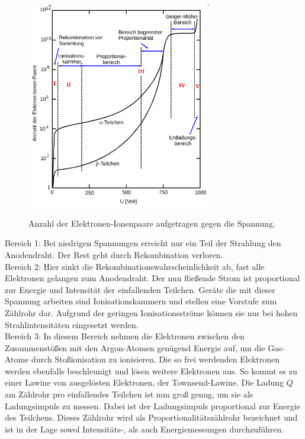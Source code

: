 \begin{figure}[H]
  \centering
  \includegraphics[height=9cm]{diagramm.png}
  \caption{Anzahl der Elektronen-Ionenpaare aufgetragen gegen die Spannung.}
  \label{fig:diagramm}
  \cite{skript}
\end{figure}

Bereich 1: Bei niedrigen Spannungen erreicht nur ein Teil der Strahlung den Anodendraht.
Der Rest geht durch Rekombination verloren.\\

Bereich 2: Hier sinkt die Rekombinationswahrscheinlichkeit ab, fast alle
Elektronen gelangen zum Anodendraht. Der nun fließende Strom ist proportional
zur Energie und Intensität der einfallenden Teilchen. Geräte die mit dieser
Spannung arbeiten sind Ionisationskammern und stellen eine Vorstufe zum
Zählrohr dar. Aufgrund der geringen Ionisationsströme können sie nur bei hohen
Strahlintensitäten eingesetzt werden.\\

Bereich 3: In diesem Bereich nehmen die Elektronen zwischen den Zusammenstößen mit
den Argon-Atomen genügend Energie auf, um die Gas-Atome durch Stoßionisation zu
ionisieren. Die so frei werdenden Elektronen werden ebenfalls beschleunigt und
lösen weitere Elektronen aus. So kommt es zu einer Lawine von ausgelösten
Elektronen, der Townsend-Lawine. Die Ladung $Q$ am Zählrohr pro einfallendes Teilchen ist
nun groß genug, um sie als Ladungsimpuls zu messen.
Dabei ist der Ladungsimpuls proportional zur Energie des Teilchens.
Dieses Zählrohr wird als Proportionalitätszählrohr bezeichnet und ist in der Lage
sowol Intensitäts-, als auch Energiemessungen durchzuführen.\\

